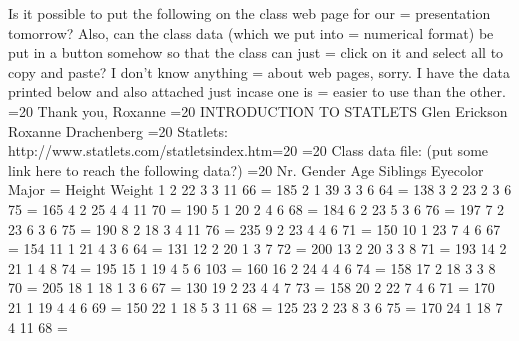 Is it possible to put the following on the class web page for our =
presentation tomorrow?  Also, can the class data (which we put into =
numerical format) be put in a button somehow so that the class can just =
click on it and select all to copy and paste?  I don't know anything =
about web pages, sorry.
I have the data printed below and also attached just incase one is =
easier to use than the other.
=20
Thank you,
Roxanne
=20
INTRODUCTION TO STATLETS
Glen Erickson
Roxanne Drachenberg
=20
Statlets:  http://www.statlets.com/statletsindex.htm=20
=20
Class data file:  (put some link here to reach the following data?)
=20
    Nr.        Gender       Age       Siblings   Eyecolor     Major      =
 Height      Weight
     1          2         22          3          3       11         66   =
      185
     2         1        39          3          3      6        64        =
 138
     3          2         23          2          3      6        75      =
   165
     4          2         25          4         4       11         70    =
     190
     5         1        20          2         4      6        68         =
184
     6          2         23          5          3      6        76      =
   197
     7          2         23          6          3      6        75      =
   190
     8          2         18          3         4       11         76    =
     235
     9          2         23          4         4      6        71       =
  150
     10        1        23          7         4      6        67         =
154
     11        1        21          4          3      6        64        =
 131
     12         2         20          1          3     7       72        =
 200
     13         2         20          3          3      8        71      =
   193
     14         2         21          1         4      8        74       =
  195
     15        1        19          4         5      6       103         =
160
     16         2         24          4         4      6        74       =
  158
     17         2         18          3          3      8        70      =
   205
     18        1        18          1          3      6        67        =
 130
     19         2         23          4         4     7       73         =
158
     20         2         22          7         4      6        71       =
  170
     21        1        19          4         4      6        69         =
150
     22        1        18          5          3       11         68     =
    125
     23         2         23          8          3      6        75      =
   170
     24        1        18          7         4       11         68      =
